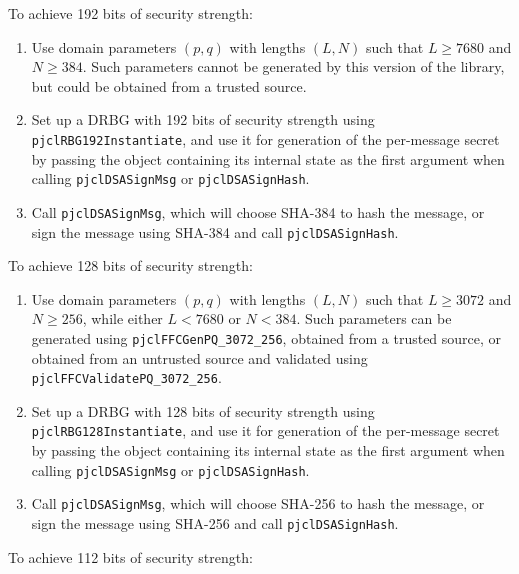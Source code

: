 \documentclass[12pt]{article}
\begin{document}
To achieve 192 bits of security strength:
\begin{enumerate}

\item Use domain parameters
$(p,q)$ with lengths $(L,N)$ such that $L \geq 7680$ and $N \geq 384$.
Such parameters cannot be generated by this version of the library,
but could be obtained from a trusted source.

\item Set up a DRBG with 192 bits of security strength using 
{\tt pjclRBG192Instantiate}, and use it for generation of the
per-message secret by passing the object containing its internal state
as the first argument when calling {\tt pjclDSASignMsg} or
{\tt pjclDSASignHash}.

\item Call {\tt pjclDSASignMsg}, which will choose SHA-384 to 
hash the message, or sign the message using SHA-384 and call
{\tt pjclDSASignHash}.

\end{enumerate}
To achieve 128 bits of security strength:
\begin{enumerate}

\item Use domain parameters
$(p,q)$ with lengths $(L,N)$ such that $L \geq 3072$ and $N \geq 256$,
while either $L < 7680$ or $N < 384$.
Such parameters can be generated using {\tt pjclFFCGenPQ\_3072\_256},
obtained from a trusted source, or obtained from an untrusted source
and validated using {\tt pjclFFCValidatePQ\_3072\_256}.

\item Set up a DRBG with 128 bits of security strength using 
{\tt pjclRBG128Instantiate}, and use it for generation of the
per-message secret by passing the object containing its internal state
as the first argument when calling {\tt pjclDSASignMsg} or
{\tt pjclDSASignHash}.

\item Call {\tt pjclDSASignMsg}, which will choose SHA-256 to 
hash the message, or sign the message using SHA-256 and call
{\tt pjclDSASignHash}.

\end{enumerate}
To achieve 112 bits of security strength:
\end{document}
